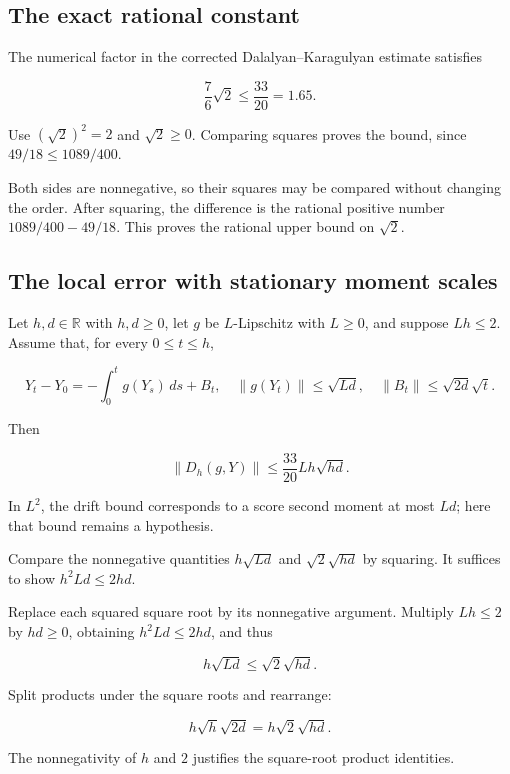\documentclass[11pt,a4paper]{article}
\begin{document}
\subsection{\texorpdfstring{The exact rational constant}{The exact rational constant}}


The numerical factor in the corrected Dalalyan–Karagulyan estimate satisfies

\[\frac76\sqrt2\le\frac{33}{20}=1.65.\]

Use \((\sqrt2)^2=2\) and \(\sqrt2\ge0\). Comparing squares proves the bound, since \(49/18\le1089/400\).



Both sides are nonnegative, so their squares may be compared without changing the order. After squaring, the difference is the rational positive number \(1089/400-49/18\). This proves the rational upper bound on \(\sqrt2\).


\subsection{\texorpdfstring{The local error with stationary moment scales}{The local error with stationary moment scales}}


Let \(h,d\in\mathbb R\) with \(h,d\ge0\), let \(g\) be \(L\)-Lipschitz with \(L\ge0\), and suppose \(Lh\le2\). Assume that, for every \(0\le t\le h\),

\[Y_t-Y_0=-\int_0^t g(Y_s)\,ds+B_t,\quad \|g(Y_t)\|\le\sqrt{Ld},\quad \|B_t\|\le\sqrt{2d}\sqrt t.\]

Then

\[\boxed{\|D_h(g,Y)\|\le\frac{33}{20}Lh\sqrt{hd}.}\]

In \(L^2\), the drift bound corresponds to a score second moment at most \(Ld\); here that bound remains a hypothesis.



Compare the nonnegative quantities \(h\sqrt{Ld}\) and \(\sqrt2\sqrt{hd}\) by squaring. It suffices to show \(h^2Ld\le2hd\).



Replace each squared square root by its nonnegative argument. Multiply \(Lh\le2\) by \(hd\ge0\), obtaining \(h^2Ld\le2hd\), and thus

\[h\sqrt{Ld}\le\sqrt2\sqrt{hd}.\]

Split products under the square roots and rearrange:

\[h\sqrt h\sqrt{2d}=h\sqrt2\sqrt{hd}.\]

The nonnegativity of \(h\) and \(2\) justifies the square-root product identities.
\end{document}
